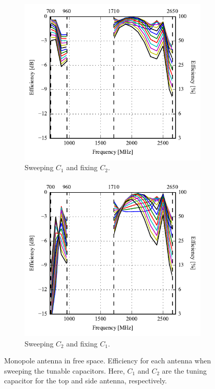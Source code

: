 \begin{figure}[htbp]
    \centering
    \begin{subfigure}{0.49\linewidth}
        \includegraphics{img/tech_sol/monopole/free_space/efficiency-ac1-csh1}
        \caption{Sweeping $C_1$ and fixing $C_2$.}
    \end{subfigure}
    \hfill
    \begin{subfigure}{0.49\linewidth}
        \includegraphics{img/tech_sol/monopole/free_space/efficiency-ac2-csh2}
        \caption{Sweeping $C_2$ and fixing $C_1$.}
    \end{subfigure}
    \caption{Monopole antenna in free space. Efficiency for each antenna when sweeping the tunable capacitors. Here, $C_1$ and $C_2$ are the tuning capacitor for the top and side antenna, respectively.}
    \label{fig:eff_sol1_free}
\end{figure}




